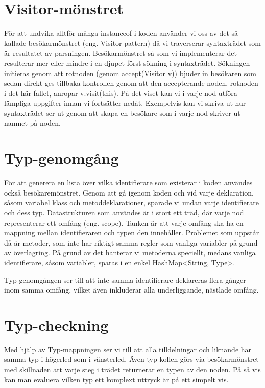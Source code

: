 \documentclass[a4paper,11pt]{article}
\renewcommand{\*}[0]{\cdot}
\begin{document}
\section*{Visitor-mönstret}

För att undvika alltför många instanceof i koden använder vi oss av det så
kallade besökarmönstret (eng. Visitor pattern) då vi traverserar syntaxträdet
som är resultatet av parsningen. Besökarmönstret så som vi implementerar det
resulterar mer eller mindre i en djupet-först-sökning i syntaxträdet. Sökningen
initieras genom att rotnoden (genom accept(Visitor v)) bjuder in besökaren som
sedan direkt ges tillbaka kontrollen genom att den accepterande noden, rotnoden
i det här fallet, anropar v.visit(this). På det viset kan vi i varje nod utföra
lämpliga uppgifter innan vi fortsätter nedåt. Exempelvis kan vi skriva ut hur
syntaxträdet ser ut genom att skapa en besökare som i varje nod skriver ut
namnet på noden.

\section*{Typ-genomgång}

För att generera en lista över vilka identifierare som existerar i koden
användes också besökaremönstret. Genom att gå igenom koden och vid varje
deklaration, såsom variabel klass och metoddeklarationer, sparade vi undan
varje identifierare och dess typ. Datastrukturen som användes är i stort ett
träd, där varje nod representerar ett omfång (eng. scope). Tanken är att varje
omfång ska ha en mappning mellan identifieraren och typen den innehåller.
Problemet som uppstår då är metoder, som inte har riktigt samma regler som
vanliga variabler på grund av överlagring. På grund av det hanterar vi
metoderna speciellt, medans vanliga identifierare, såsom variabler, sparas i en
enkel HashMap<String, Type>.

Typ-genomgången ser till att inte samma identifierare deklareras flera gånger
inom samma omfång, vilket även inkluderar alla underliggande, nästlade omfång.

\section*{Typ-checkning}

Med hjälp av Typ-mappningen ser vi till att alla tilldelningar och liknande har
samma typ i högerled som i vänsterled. Även typ-kollen görs via besökarmönstret
med skillnaden att varje steg i trädet returnerar en typen av den noden. På så
vis kan man evaluera vilken typ ett komplext uttryck är på ett simpelt vis.
\end{document}

